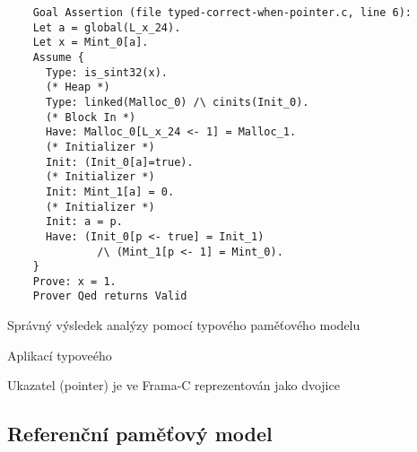 \begin{listing}[H]
    \begin{verbatim}
    Goal Assertion (file typed-correct-when-pointer.c, line 6):
    Let a = global(L_x_24).
    Let x = Mint_0[a].
    Assume {
      Type: is_sint32(x).
      (* Heap *)
      Type: linked(Malloc_0) /\ cinits(Init_0).
      (* Block In *)
      Have: Malloc_0[L_x_24 <- 1] = Malloc_1.
      (* Initializer *)
      Init: (Init_0[a]=true).
      (* Initializer *)
      Init: Mint_1[a] = 0.
      (* Initializer *)
      Init: a = p.
      Have: (Init_0[p <- true] = Init_1)
              /\ (Mint_1[p <- 1] = Mint_0).
    }
    Prove: x = 1.
    Prover Qed returns Valid
    \end{verbatim}
    \caption{Správný výsledek analýzy pomocí typového paměťového modelu}
    \label{list:typed-pointer-valid-example-result}
\end{listing}


Aplikací typoveého


Ukazatel (pointer) je ve Frama\mbox{-}C reprezentován jako dvojice


\subsection{Referenční paměťový model}
\label{subsec:referencni-pametovy-model}

